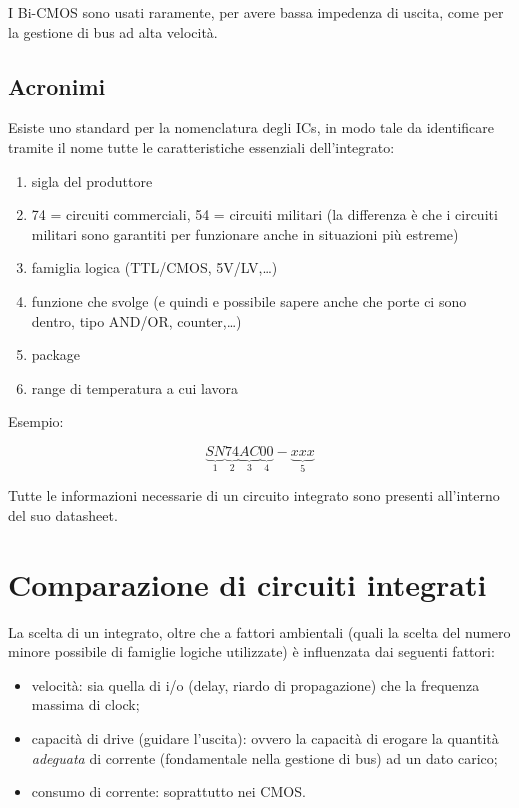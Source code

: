 \documentclass[
]{book}
\providecommand{\tightlist}{%
  \setlength{\itemsep}{0pt}\setlength{\parskip}{0pt}}
\begin{document}
I Bi-CMOS sono usati raramente, per avere bassa impedenza di uscita,
come per la gestione di bus ad alta velocità.

\subsection{Acronimi}\label{acronimi}

Esiste uno standard per la nomenclatura degli ICs, in modo tale da
identificare tramite il nome tutte le caratteristiche essenziali
dell'integrato:

\begin{enumerate}
\def\labelenumi{\arabic{enumi}.}
\tightlist
\item
  sigla del produttore
\item
  74 = circuiti commerciali, 54 = circuiti militari (la differenza è che
  i circuiti militari sono garantiti per funzionare anche in situazioni
  più estreme)
\item
  famiglia logica (TTL/CMOS, 5V/LV,\ldots)
\item
  funzione che svolge (e quindi e possibile sapere anche che porte ci
  sono dentro, tipo AND/OR, counter,\ldots)
\item
  package
\item
  range di temperatura a cui lavora
\end{enumerate}

Esempio:

\[\underbrace{SN}_{1}\underbrace{74}_{2}\underbrace{AC}_{3}\underbrace{00}_{4}-
\underbrace{xxx}_{5}\]

Tutte le informazioni necessarie di un circuito integrato sono presenti
all'interno del suo datasheet.

\section{Comparazione di circuiti
integrati}\label{comparazione-di-circuiti-integrati}

La scelta di un integrato, oltre che a fattori ambientali (quali la
scelta del numero minore possibile di famiglie logiche utilizzate) è
influenzata dai seguenti fattori:

\begin{itemize}
\tightlist
\item
  velocità: sia quella di i/o (delay, riardo di propagazione) che la
  frequenza massima di clock;
\item
  capacità di drive (guidare l'uscita): ovvero la capacità di erogare la
  quantità \emph{adeguata} di corrente (fondamentale nella gestione di
  bus) ad un dato carico;
\item
  consumo di corrente: soprattutto nei CMOS.
\end{itemize}
\end{document}
